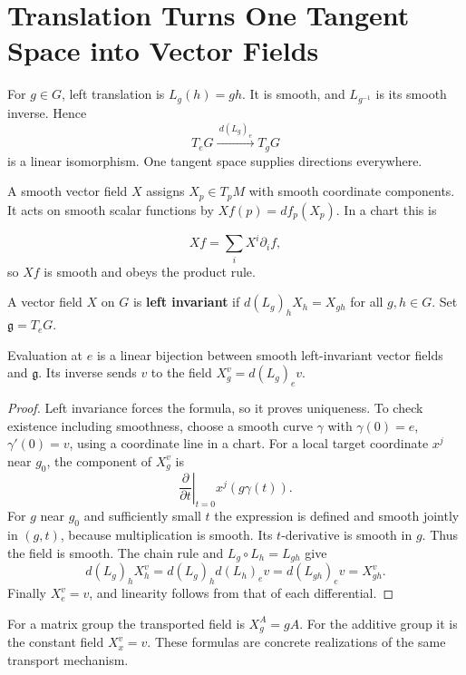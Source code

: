 \section{Translation Turns One Tangent Space into Vector Fields}
\label{sec:left-invariant-fields}
For $g\in G$, left translation is $L_g(h)=gh$. It is smooth, and
$L_{g^{-1}}$ is its smooth inverse. Hence
\[
T_eG\xrightarrow{\ d(L_g)_e\ }T_gG
\]
is a linear isomorphism. One tangent space supplies directions everywhere.

A smooth vector field $X$ assigns $X_p\in T_pM$ with smooth coordinate
components. It acts on smooth scalar functions by
$Xf(p)=df_p(X_p)$. In a chart this is

\[
Xf=\sum_i X^i\partial_i f,
\]
 so $Xf$ is smooth and obeys the product rule.
\begin{definition}
A vector field $X$ on $G$ is \textbf{left invariant} if
$d(L_g)_hX_h=X_{gh}$ for all $g,h\in G$. Set $\mathfrak g=T_eG$.
\end{definition}
\begin{proposition}\label{prop:left-invariant-identification}
Evaluation at $e$ is a linear bijection between smooth left-invariant
vector fields and $\mathfrak g$. Its inverse sends $v$ to the field
$X^v_g=d(L_g)_e v$.
\end{proposition}
\begin{proof}
Left invariance forces the formula, so it proves uniqueness. To check
existence including smoothness, choose a smooth curve $\gamma$ with
$\gamma(0)=e$, $\gamma'(0)=v$, using a coordinate line in a chart.
For a local target coordinate $x^j$ near $g_0$, the component of $X^v_g$
is
\[
\left.\frac{\partial}{\partial t}\right|_{t=0}x^j(g\gamma(t)).
\]
For $g$ near $g_0$ and sufficiently small $t$ the expression is defined
and smooth jointly in $(g,t)$, because multiplication is smooth. Its
$t$-derivative is smooth in $g$. Thus the field is smooth. The chain rule
and $L_g\circ L_h=L_{gh}$ give
\[
d(L_g)_hX^v_h=d(L_g)_h d(L_h)_e v=d(L_{gh})_e v=X^v_{gh}.
\]
Finally $X^v_e=v$, and linearity follows from that of each differential.
\end{proof}
For a matrix group the transported field is $X^A_g=gA$. For the additive
group it is the constant field $X^v_x=v$. These formulas are concrete
realizations of the same transport mechanism.


